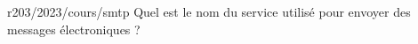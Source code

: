\begin{question}{r203/2023/cours/smtp}
  Quel est le nom du service utilisé pour envoyer des messages
  électroniques ?
  \begin{reponses}
  \end{reponses}
\end{question}
